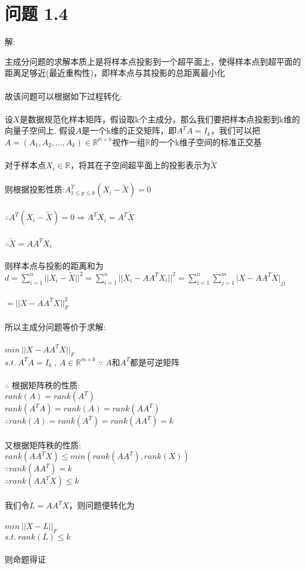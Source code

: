 \documentclass[]{article}
\begin{document}
\section{问题 1.4}
\begin{flushleft}
	解:
\end{flushleft}
主成分问题的求解本质上是将样本点投影到一个超平面上，使得样本点到超平面的距离足够近(最近重构性)，即样本点与其投影的总距离最小化\\\\
故该问题可以根据如下过程转化:\\\\
设$X$是数据规范化样本矩阵，假设取k个主成分，那么我们要把样本点投影到k维的向量子空间上. 假设$A$是一个k维的正交矩阵，即$A^TA=I_k$，我们可以把$A=(A_1,A_2,...,A_k)\in \mathbb{R^{m\times k}}$视作一组$\mathbb{R}$的一个k维子空间的标准正交基\\\\
对于样本点$X_i\in \mathbb{R}$，将其在子空间超平面上的投影表示为$\tilde{X}$\\\\
则根据投影性质:$A_{1\leq p\leq k}^T(X_i-\tilde{X})=0$\\\\
$\therefore A^T(X_i-\tilde{X})=0 \Rightarrow A^TX_i=A^T\tilde{X}$\\\\
$\therefore \tilde{X}=AA^TX_i$\\\\
则样本点与投影的距离和为$d=\sum_{i=1}^{n}\vert\vert X_i-\tilde{X}\vert\vert^2=\sum_{i=1}^{n}\vert\vert X_i-AA^TX_i\vert\vert^2=\sum_{i=1}^{n}\sum_{j=1}^{m}\vert X-AA^TX\vert_{jj}$\\\\
$=\vert\vert X-AA^TX\vert\vert_F^2$\\\\
所以主成分问题等价于求解:\\\\
$min\ \vert\vert X-AA^TX\vert\vert_F$\\
$s.t. \ A^TA=I_k\ ,\ A\in \mathbb{R}^{m\times k}$
$\because$  $A$和$A^T$都是可逆矩阵\\\\
$\therefore$ 根据矩阵秩的性质:\\
$rank(A)=rank(A^T)$\\
$rank(A^TA)=rank(A)=rank(AA^T)$\\
$\therefore rank(A)=rank(A^T)=rank(AA^T)=k$\\\\
又根据矩阵秩的性质:\\
$rank(AA^TX)\leq min(rank(AA^T),rank(X))$\\
$\because rank(AA^T)=k$\\
$\therefore rank(AA^TX)\leq k$\\\\
我们令$L=AA^TX$，则问题便转化为\\\\
$min\ \vert\vert X-L\vert\vert_F$\\
$s.t. \ rank(L)\leq k$\\\\
则命题得证
\end{document}
